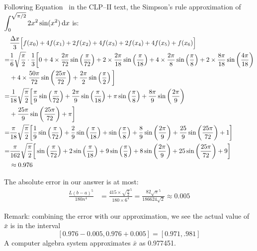 \begin{solution}
\begin{center}
\end{center}

Following Equation~ in the CLP--II text, the Simpson's rule approximation of $\displaystyle\int_0^{\sqrt{\pi/2}}2x^2\sin(x^2)\,\mathrm{d}x$ is:
\begin{align*}
&\frac{\Delta x}{3}\Big[f(x_0)+4f(x_1)+2f(x_2)+4f(x_3)+2f(x_4)+4f(x_5)+f(x_6)\Big]\\
=&\frac{1}{6}\sqrt{\frac{\pi}{2}}\cdot\frac{1}{3}\bigg[
0+4\times \frac{2\pi}{72}\sin\left(\frac{\pi}{72}\right)+2\times\frac{2\pi}{18}\sin\left(\frac{\pi}{18}\right)+4\times\frac{2\pi}{8}\sin\left(\frac{\pi}{8}\right)+
2\times \frac{8\pi}{18}\sin\left(\frac{4\pi}{18}\right)\\
&+4\times \frac{50\pi}{72}\sin\left(\frac{25\pi}{72}\right)
+\frac{2\pi}{2}\sin\left(\frac{\pi}{2}\right)
\bigg]\\=&\frac{1}{18}\sqrt{\frac{\pi}{2}}\bigg[
\frac{\pi}{9}\sin\left(\frac{\pi}{72}\right)+\frac{2\pi}{9}\sin\left(\frac{\pi}{18}\right)+\pi\sin\left(\frac{\pi}{8}\right)+
\frac{8\pi}{9}\sin\left(\frac{2\pi}{9}\right)\\
&+\frac{25\pi}{9}\sin\left(\frac{25\pi}{72}\right)
+\pi\bigg]\\=&\frac{\pi}{18}\sqrt{\frac{\pi}{2}}\bigg[
\frac{1}{9}\sin\left(\frac{\pi}{72}\right)+\frac{2}{9}\sin\left(\frac{\pi}{18}\right)+\sin\left(\frac{\pi}{8}\right)+
\frac{8}{9}\sin\left(\frac{2\pi}{9}\right)+\frac{25}{9}\sin\left(\frac{25\pi}{72}\right)
+1\bigg]\\=&\frac{\pi}{162}\sqrt{\frac{\pi}{2}}\bigg[
\sin\left(\frac{\pi}{72}\right)+2\sin\left(\frac{\pi}{18}\right)+9\sin\left(\frac{\pi}{8}\right)+
8\sin\left(\frac{2\pi}{9}\right)+25\sin\left(\frac{25\pi}{72}\right)
+9\bigg]\\
&\approx 0.976
\end{align*}

The absolute error in our answer is at most:
\begin{align*}
\frac{L(b-a)^5}{180n^4}&=\frac{415\times\sqrt{\frac{\pi}{2}}^5}{180\times 6^4} = \frac{82\sqrt{\pi}^5}{186624\sqrt{2}}\approx 0.005
\end{align*}


Remark: combining the error with our approximation, we see the actual value of $\bar x$ is in the interval
\[\left[0.976-0.005,0.976+0.005\right] = \left[0.971,.981\right]\]
A computer algebra system approximates $\bar x$ as 0.977451.
\end{solution}
